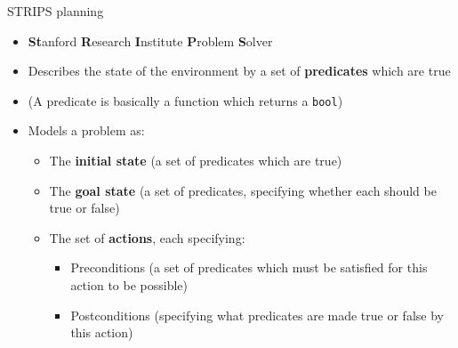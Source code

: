 \begin{frame}{STRIPS planning}
	\begin{itemize}
		\pause\item \textbf{St}anford \textbf{R}esearch \textbf{I}nstitute \textbf{P}roblem \textbf{S}olver
		\pause\item Describes the state of the environment by a set of \textbf{predicates} which are true
		\pause\item (A predicate is basically a function which returns a \texttt{bool})
		\pause\item Models a problem as:
			\begin{itemize}
				\pause\item The \textbf{initial state} (a set of predicates which are true)
				\pause\item The \textbf{goal state} (a set of predicates, specifying whether each should be true or false)
				\pause\item The set of \textbf{actions}, each specifying:
					\begin{itemize}
						\pause\item Preconditions (a set of predicates which must be satisfied for this action to be possible) 
						\pause\item Postconditions (specifying what predicates are made true or false by this action)
					\end{itemize}
			\end{itemize}
	\end{itemize}
\end{frame}

